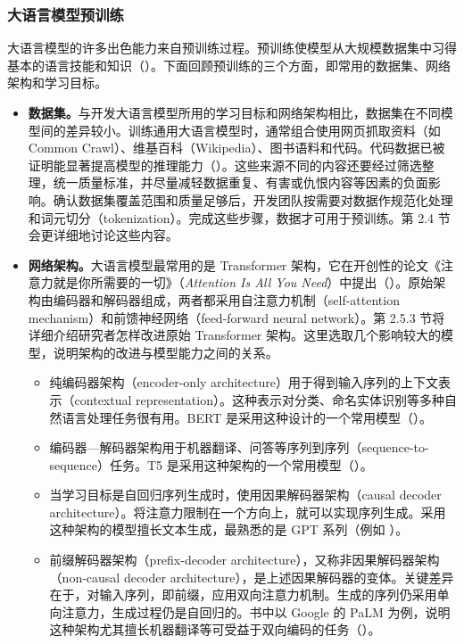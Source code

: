 \subsubsection{大语言模型预训练}
大语言模型的许多出色能力来自预训练过程。预训练使模型从大规模数据集中习得基本的语言技能和知识（）。下面回顾预训练的三个方面，即常用的数据集、网络架构和学习目标。
\begin{itemize}
\item \textbf{数据集。}与开发大语言模型所用的学习目标和网络架构相比，数据集在不同模型间的差异较小。训练通用大语言模型时，通常组合使用网页抓取资料（如 Common Crawl）、维基百科（Wikipedia）、图书语料和代码。代码数据已被证明能显著提高模型的推理能力（）。这些来源不同的内容还要经过筛选整理，统一质量标准，并尽量减轻数据重复、有害或仇恨内容等因素的负面影响。确认数据集覆盖范围和质量足够后，开发团队按需要对数据作规范化处理和词元切分（tokenization）。完成这些步骤，数据才可用于预训练。第 2.4 节会更详细地讨论这些内容。

\item \textbf{网络架构。}大语言模型最常用的是 Transformer 架构，它在开创性的论文《注意力就是你所需要的一切》（\textit{Attention Is All You Need}）中提出（）。原始架构由编码器和解码器组成，两者都采用自注意力机制（self-attention mechanism）和前馈神经网络（feed-forward neural network）。第 2.5.3 节将详细介绍研究者怎样改进原始 Transformer 架构。这里选取几个影响较大的模型，说明架构的改进与模型能力之间的关系。
\begin{itemize}[label=--]
\item 纯编码器架构（encoder-only architecture）用于得到输入序列的上下文表示（contextual representation）。这种表示对分类、命名实体识别等多种自然语言处理任务很有用。BERT 是采用这种设计的一个常用模型（）。
\item 编码器—解码器架构用于机器翻译、问答等序列到序列（sequence-to-sequence）任务。T5 是采用这种架构的一个常用模型（）。
\item 当学习目标是自回归序列生成时，使用因果解码器架构（causal decoder architecture）。将注意力限制在一个方向上，就可以实现序列生成。采用这种架构的模型擅长文本生成，最熟悉的是 GPT 系列（例如 ）。
\item 前缀解码器架构（prefix-decoder architecture），又称非因果解码器架构（non-causal decoder architecture），是上述因果解码器的变体。关键差异在于，对输入序列，即前缀，应用双向注意力机制。生成的序列仍采用单向注意力，生成过程仍是自回归的。书中以 Google 的 PaLM 为例，说明这种架构尤其擅长机器翻译等可受益于双向编码的任务（）。
\end{itemize}


\end{itemize}
